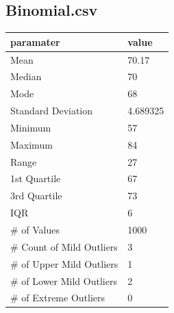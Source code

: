 \documentclass[10pt]{article}
\begin{document}
\subsection*{Binomial.csv}
\begin{table}[h!]
  \begin{center}
    \scriptsize
    \begin{tabular}{ll}
      \toprule
      paramater & value\\
      \midrule
 	Mean & 70.17\\
	Median & 70\\
	Mode & 68\\
	Standard Deviation & 4.689325\\
	Minimum & 57\\
	Maximum & 84\\
	Range & 27\\
	1st Quartile & 67\\
	3rd Quartile & 73\\
	IQR & 6\\
	\# of Values & 1000\\ 
	\# Count of Mild Outliers & 3\\
	\# of Upper Mild Outliers & 1\\
	\# of Lower Mild Outliers & 2\\
	\# of Extreme Outliers & 0\\
       \bottomrule
    \end{tabular}
  \end{center}
\end{table}
\end{document}
